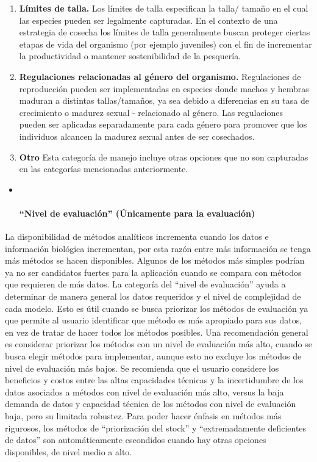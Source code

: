 \documentclass[
  11pt,
]{book}
\begin{document}
\begin{itemize}
\begin{enumerate}
  \item
    \textbf{Límites de talla.} Los límites de talla especifican la talla/ tamaño en el cual las especies pueden ser legalmente capturadas. En el contexto de una estrategia de cosecha los límites de talla generalmente buscan proteger ciertas etapas de vida del organismo (por ejemplo juveniles) con el fin de incrementar la productividad o mantener sostenibilidad de la pesquería.
  \item
    \textbf{Regulaciones relacionadas al género del organismo.} Regulaciones de reproducción pueden ser implementadas en especies donde machos y hembras maduran a distintas tallas/tamaños, ya sea debido a diferencias en su tasa de crecimiento o madurez sexual - relacionado al género. Las regulaciones pueden ser aplicadas separadamente para cada género para promover que los individuos alcancen la madurez sexual antes de ser cosechados.
  \item
    \textbf{Otro} Esta categoría de manejo incluye otras opciones que no son capturadas en las categorías mencionadas anteriormente.
  \end{enumerate}
\end{itemize}

\begin{itemize}
\item ~
  \hypertarget{nivel-de-evaluaciuxf3n-uxfanicamente-para-la-evaluaciuxf3n}{%
  \paragraph{``Nivel de evaluación'' (Únicamente para la evaluación)}\label{nivel-de-evaluaciuxf3n-uxfanicamente-para-la-evaluaciuxf3n}}
\end{itemize}

La disponibilidad de métodos analíticos incrementa cuando los datos e información biológica incrementan, por esta razón entre más información se tenga más métodos se hacen disponibles. Algunos de los métodos más simples podrían ya no ser candidatos fuertes para la aplicación cuando se compara con métodos que requieren de más datos. La categoría del ``nivel de evaluación'' ayuda a determinar de manera general los datos requeridos y el nivel de complejidad de cada modelo. Esto es útil cuando se busca priorizar los métodos de evaluación ya que permite al usuario identificar que método es más apropiado para sus datos, en vez de tratar de hacer todos los métodos posibles. Una recomendación general es considerar priorizar los métodos con un nivel de evaluación más alto, cuando se busca elegir métodos para implementar, aunque esto no excluye los métodos de nivel de evaluación más bajos. Se recomienda que el usuario considere los beneficios y costos entre las altas capacidades técnicas y la incertidumbre de los datos asociados a métodos con nivel de evaluación más alto, versus la baja demanda de datos y capacidad técnica de los métodos con nivel de evaluación baja, pero su limitada robustez. Para poder hacer énfasis en métodos más rigurosos, los métodos de ``priorización del stock'' y ``extremadamente deficientes de datos'' son automáticamente escondidos cuando hay otras opciones disponibles, de nivel medio a alto.
\end{document}
